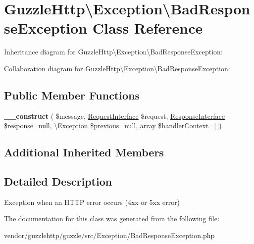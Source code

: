 \hypertarget{classGuzzleHttp_1_1Exception_1_1BadResponseException}{}\section{Guzzle\+Http\textbackslash{}Exception\textbackslash{}Bad\+Response\+Exception Class Reference}
\label{classGuzzleHttp_1_1Exception_1_1BadResponseException}


Inheritance diagram for Guzzle\+Http\textbackslash{}Exception\textbackslash{}Bad\+Response\+Exception\+:


Collaboration diagram for Guzzle\+Http\textbackslash{}Exception\textbackslash{}Bad\+Response\+Exception\+:
\subsection*{Public Member Functions}
\begin{DoxyCompactItemize}
\item 
\mbox{\label{classGuzzleHttp_1_1Exception_1_1BadResponseException_ad5df3997e7ce6d62ffdc7ea27ff6b3aa}} 
{\bfseries \+\_\+\+\_\+construct} ( \$message, \hyperlink{interfacePsr_1_1Http_1_1Message_1_1RequestInterface}{Request\+Interface} \$request, \hyperlink{interfacePsr_1_1Http_1_1Message_1_1ResponseInterface}{Response\+Interface} \$response=null, \textbackslash{}Exception \$previous=null, array \$handler\+Context=\mbox{[}$\,$\mbox{]})
\end{DoxyCompactItemize}
\subsection*{Additional Inherited Members}


\subsection{Detailed Description}
Exception when an H\+T\+TP error occurs (4xx or 5xx error) 

The documentation for this class was generated from the following file\+:\begin{DoxyCompactItemize}
\item 
vendor/guzzlehttp/guzzle/src/\+Exception/Bad\+Response\+Exception.\+php\end{DoxyCompactItemize}
